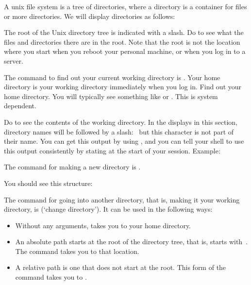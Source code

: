 A unix file system is a tree of directories, where a directory is a
container for files or more directories. We will display directories
as follows:


The root of the Unix directory tree is indicated with a slash. Do
 to see what the files and directories there are in the
root. Note that the root is not the location where you start when you
reboot your personal machine, or when you log in to a server.

\practical
{The command to find out your current working directory
is . Your home directory is your working directory immediately
when you log in. Find out your home directory.}
{You will typically see something like  or
  . This is system dependent.}{}

Do  to see the contents of the working directory. In the
displays in this section, directory names will be followed by a
slash:~ but this character is not part of their name.  You can
get this output by using , and you can tell your shell to
use this output consistently by stating  at the start of your
session. Example:


The command for making a new directory is .

{You should see this structure:
}{}

The command for going into another directory, that is, making it your
working directory, is  (`change directory'). It can be used in
the following ways:
\begin{itemize}
\item {} Without any arguments,  takes you to your home directory.
\item {} An absolute path starts at the root of
  the directory tree, that is, starts with~\n{/}. The  command
  takes you to that location.
\item {} A relative path is one that does not
  start at the root. This form of the  command takes you to
  .
\end{itemize}

